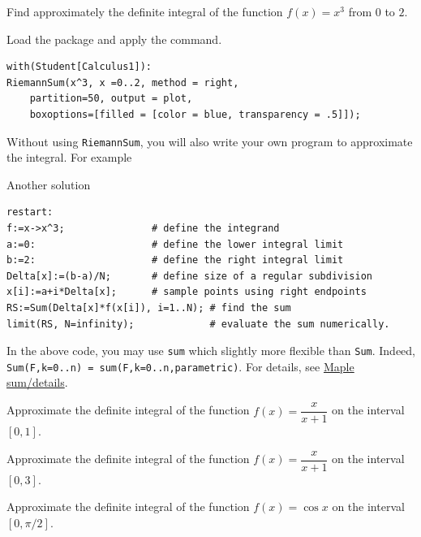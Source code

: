\documentclass[en,11pt,simple]{elegantbook}
\let\BeginKnitrBlock\begin \let\EndKnitrBlock\end
\begin{document}
\BeginKnitrBlock{example}{}{}
\protect\hypertarget{exm:unnamed-chunk-131}{}{\label{exm:unnamed-chunk-131} }
Find approximately the definite integral of the function \(f(x)=x^3\) from \(0\) to \(2\).
\EndKnitrBlock{example}

\BeginKnitrBlock{solution}{}{}
{}
Load the package and apply the command.

\begin{verbatim}
with(Student[Calculus1]):
RiemannSum(x^3, x =0..2, method = right,
    partition=50, output = plot,
    boxoptions=[filled = [color = blue, transparency = .5]]);
\end{verbatim}
\EndKnitrBlock{solution}

Without using \texttt{RiemannSum}, you will also write your own program to approximate the integral. For example

\BeginKnitrBlock{solution}{Another solution}{}
{}

\begin{verbatim}
restart:  
f:=x->x^3;               # define the integrand
a:=0:                    # define the lower integral limit
b:=2:                    # define the right integral limit
Delta[x]:=(b-a)/N;       # define size of a regular subdivision
x[i]:=a+i*Delta[x];      # sample points using right endpoints
RS:=Sum(Delta[x]*f(x[i]), i=1..N); # find the sum
limit(RS, N=infinity);             # evaluate the sum numerically.
\end{verbatim}
\EndKnitrBlock{solution}

\BeginKnitrBlock{remark}{}{}
{}
In the above code, you may use \texttt{sum} which slightly more flexible than \texttt{Sum}. Indeed, \texttt{Sum(F,k=0..n)\ =\ sum(F,k=0..n,parametric)}. For details, see \href{https://www.maplesoft.com/support/help/Maple/view.aspx?path=sum/details}{Maple sum/details}.
\EndKnitrBlock{remark}

\BeginKnitrBlock{exercise}{}{}
\protect\hypertarget{exr:unnamed-chunk-135}{}{\label{exr:unnamed-chunk-135} }
Approximate the definite integral of the function \(f(x)=\dfrac{x}{x+1}\) on the interval \([0, 1]\).
\EndKnitrBlock{exercise}

\BeginKnitrBlock{exercise}{}{}
\protect\hypertarget{exr:unnamed-chunk-136}{}{\label{exr:unnamed-chunk-136} }
Approximate the definite integral of the function \(f(x)=\dfrac{x}{x+1}\) on the interval \([0, 3]\).
\EndKnitrBlock{exercise}

\BeginKnitrBlock{exercise}{}{}
\protect\hypertarget{exr:unnamed-chunk-137}{}{\label{exr:unnamed-chunk-137} }
Approximate the definite integral of the function \(f(x)=\cos x\) on the interval \([0, \pi/2]\).
\EndKnitrBlock{exercise}
\end{document}
